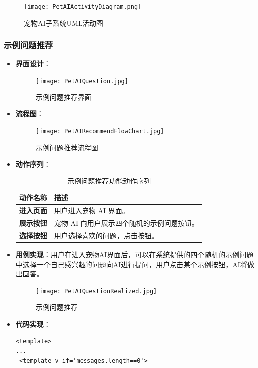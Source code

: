 \begin{figure}[H]
	\centering
	\texttt{[image: PetAIActivityDiagram.png]} 
	\caption{宠物AI子系统UML活动图}
	\label{fig:PetAIActivityDiagram}
\end{figure}

\subsubsection{示例问题推荐}

\begin{itemize}
	\item \textbf{界面设计}：
	\begin{figure}[H]
		\centering
		\texttt{[image: PetAIQuestion.jpg]}
		\caption{示例问题推荐界面}
		\label{PetAIQuestion}
	\end{figure}
	\item \textbf{流程图}：
	\begin{figure}[H]
		\centering
		\texttt{[image: PetAIRecommendFlowChart.jpg]}
		\caption{示例问题推荐流程图}
		\label{PetAIRecommendFlowChart}
	\end{figure}
	\item \textbf{动作序列}：
	\begin{table}[H]
		\centering
		\caption{示例问题推荐功能动作序列}
		\renewcommand\arraystretch{1.5}
		\begin{tabular}{|c|>{\raggedright\arraybackslash}p{10cm}|}
			\hline
			\textbf{动作名称} & \textbf{描述} \\ \hline
			\textbf{进入页面} & 用户进入宠物 AI 界面。  \\ \hline
			\textbf{展示按钮} & 宠物 AI 向用户展示四个随机的示例问题按钮。 \\ \hline
			\textbf{选择按钮} & 用户选择喜欢的问题，点击按钮。 \\ \hline
		\end{tabular}
	\end{table}
	\item \textbf{用例实现}：用户在进入宠物AI界面后，可以在系统提供的四个随机的示例问题中选择一个自己感兴趣的问题向AI进行提问，用户点击某个示例按钮，AI将做出回答。
	\begin{figure}[H]
		\centering
		\texttt{[image: PetAIQuestionRealized.jpg]}
		\caption{示例问题推荐}
		\label{PetAIQuestionRealized}
	\end{figure}
	\item \textbf{代码实现}：
	\begin{verbatim}
<template>
...
 <template v-if='messages.length==0'>

\end{verbatim}
\end{itemize}
